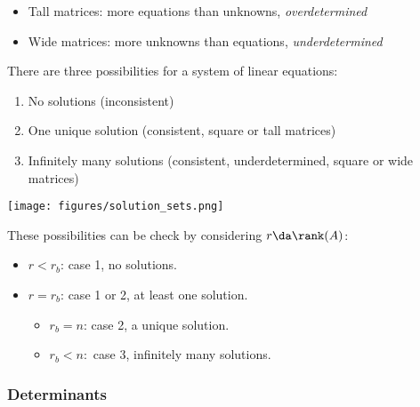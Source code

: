 \begin{remark}

\envlist

\begin{itemize}
\tightlist
\item
  Tall matrices: more equations than unknowns, \emph{overdetermined}
\item
  Wide matrices: more unknowns than equations, \emph{underdetermined}
\end{itemize}

\end{remark}

\begin{proposition}

There are three possibilities for a system of linear equations:

\begin{enumerate}
\def\labelenumi{\arabic{enumi}.}
\tightlist
\item
  No solutions (inconsistent)
\item
  One unique solution (consistent, square or tall matrices)
\item
  Infinitely many solutions (consistent, underdetermined, square or wide
  matrices)
\end{enumerate}

\texttt{[image: figures/solution\_sets.png]}

These possibilities can be check by considering \(r\da \rank(A)\):

\begin{itemize}
\tightlist
\item
  \(r < r_b\): case 1, no solutions.
\item
  \(r = r_b\): case 1 or 2, at least one solution.

  \begin{itemize}
  \tightlist
  \item
    \(r_b = n\): case 2, a unique solution.
  \item
    \(r_b < n:\) case 3, infinitely many solutions.
  \end{itemize}
\end{itemize}

\end{proposition}

\hypertarget{determinants}{%
\subsubsection{Determinants}\label{determinants}}

